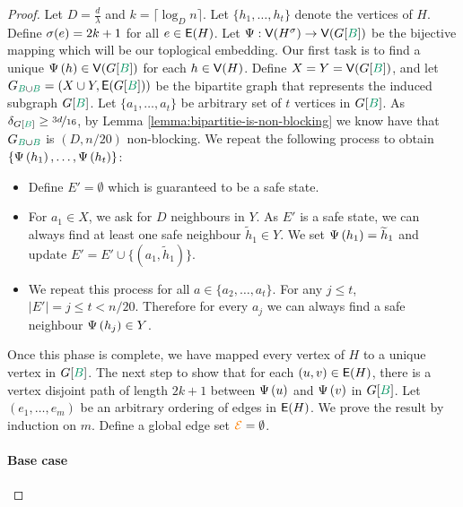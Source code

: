 \documentclass[11pt]{article}
\begin{document}
\begin{proof}
Let $D = \frac{d}{\lambda}$ and $k =  \lceil\log_D n\rceil$.
Let $\{ h_1, \dots, h_t\}$ denote the vertices of $H$.
Define $\sigma(e) = 2k+1$ for all $e \in \mathsf{E}(H)$.
Let $\EmbeddingFunc: \Vertices{\Subdivision{H}{\sigma}} \rightarrow \Vertices{G[{\GreenB}]}$ be the bijective mapping which will be our toplogical embedding.
Our first task is to find a unique $\Embedding{h} \in \Vertices{G[\GreenB]}$ for each $h \in \mathsf{V}(H)$.
Define $X = Y = \Vertices{G[\GreenB]}$, and let $\BipartiteG = (X \cup Y, \Edges{G[\GreenB]})$ be the bipartite graph that represents the induced subgraph $G[\GreenB]$.
Let $\{a_1, \dots, a_{t}\}$ be arbitrary set of $t$ vertices in $G[\GreenB]$.
As $\MinimalDegree{G[\GreenB]} \geq \nicefrac{3d}{16}$, by Lemma \ref{lemma:bipartitie-is-non-blocking} we know have that $\BipartiteG$ is $(D, n/20)$ non-blocking.
We repeat the following process to obtain $\{ \Psi\left(h_1\right), \dots, \Psi\left(h_t\right)\}$: 

\begin{itemize}
\item Define $E' = \emptyset$ which is guaranteed to be a  safe state.
  
\item For $a_1 \in X$, we ask for $D$ neighbours in $Y$. As $E'$ is a safe state, we can always find at least one safe neighbour $\tilde{h}_1 \in Y$. We set $\Psi\left(h_1\right) = \widetilde{h}_1$ and update $E' = E'  \cup \{(a_1, \tilde{h}_1)\}$.
  
\item We repeat this process for all $a \in \{a_2, \dots, a_t\}$. For any $j \leq t$,  $|E'| = j \leq t < n/20$.
  Therefore for every $a_j$ we can always find a safe neighbour $\Psi\left(h_j\right) \in Y$.
  
\end{itemize}

Once this phase is complete, we have mapped every vertex of $H$ to a unique vertex in $G[\GreenB]$.
The next step to show that for each $(u,v) \in \mathsf{E}(H)$, there is a vertex disjoint path of length $2k+1$ between $\Psi\left(u\right)$ and $\Psi\left(v\right)$ in $G[\GreenB]$.
Let $(e_1, \dots, e_m)$ be an arbitrary ordering of edges in $\mathsf{E}(H)$.
We prove the result by induction on $m$. Define a global edge set  $\textcolor{orange}{\mathcal{E}} = \emptyset$.

\paragraph{Base case} 


\end{proof}
\end{document}
